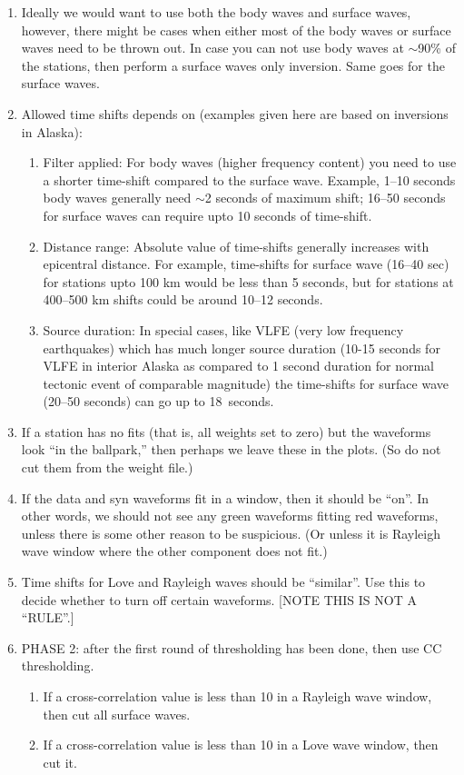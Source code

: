 \begin{enumerate}
\begin{enumerate}
\item Ideally we would want to use both the body waves and surface waves, however, there might be cases when either most of the body waves or surface waves need to be thrown out. In case you can not use body waves at $\sim$90\% of the stations, then perform a surface waves only inversion. Same goes for the surface waves.

\item Allowed time shifts depends on (examples given here are based on inversions in Alaska):
%
\begin{enumerate}
\item Filter applied: For body waves (higher frequency content) you need to use a shorter time-shift compared to the surface wave. Example, 1--10 seconds body waves generally need $\sim$2 seconds of maximum shift; 16--50 seconds for surface waves can require upto 10 seconds of time-shift.
\item Distance range: Absolute value of time-shifts generally increases with epicentral distance. For example, time-shifts for surface wave (16--40 sec) for stations upto 100 km would be less than 5 seconds, but for stations at 400--500 km shifts could be around 10--12 seconds.
\item Source duration: In special cases, like VLFE (very low frequency earthquakes) which has much longer source duration (10-15 seconds for  VLFE in interior Alaska as compared to 1 second duration for normal tectonic event of comparable magnitude) the time-shifts for surface wave (20--50 seconds) can go up to 18~seconds.
\end{enumerate}

\item If a station has no fits (that is, all weights set to zero) but the waveforms look ``in the ballpark,'' then perhaps we leave these in the plots. (So do not cut them from the weight file.)
\item If the data and syn waveforms fit in a window, then it should be “on”. In other words, we should not see any green waveforms fitting red waveforms, unless there is some other reason to be suspicious. (Or unless it is Rayleigh wave window where the other component does not fit.)
\item Time shifts for Love and Rayleigh waves should be ``similar''. Use this to decide whether to turn off certain waveforms. [NOTE THIS IS NOT A ``RULE''.]

\item PHASE 2: after the first round of thresholding has been done, then use CC thresholding.
\begin{enumerate}
\item If a cross-correlation value is less than 10 in a Rayleigh wave window, then cut all surface waves.
\item If a cross-correlation value is less than 10 in a Love wave window, then cut it.
\end{enumerate}

\end{enumerate}


\end{enumerate}


